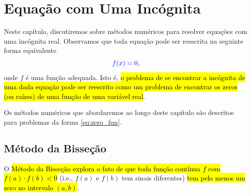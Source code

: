 
\chapter{Equação com Uma Incógnita}\label{cap_eq1d}

Neste capítulo, discutiremos sobre métodos numéricos para resolver equações com uma incógnita real. Observamos que toda equação pode ser reescrita na seguinte forma equivalente
\begin{equation}\label{eq:zero_fun}
  {\color{blue}f(x) = 0},
\end{equation}
onde $f$ é uma função adequada. Isto é, \hl{o problema de se encontrar a incógnita de uma dada equação pode ser reescrito como um problema de encontrar os zeros (ou raízes) de uma função de uma variável real}.

Os métodos numéricos que abordaremos ao longo deste capítulo são descritos para problemas da forma \eqref{eq:zero_fun}.

\section{Método da Bisseção}\label{cap_eq1d_sec_bissec}

O \hl{Método da Bisseção explora o fato de que toda função contínua $f$ com $f(a)\cdot f(b) < 0$} (i.e., $f(a)$ e $f(b)$ tem sinais diferentes) \hl{tem pelo menos um zero no intervalo $(a, b)$}.

